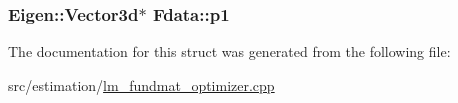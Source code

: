 \subsubsection[{p1}]{\setlength{\rightskip}{0pt plus 5cm}Eigen\+::\+Vector3d$\ast$ Fdata\+::p1}\label{structFdata_af6610aef66eaa2706fe2c60e831d8ec7}


The documentation for this struct was generated from the following file\+:\begin{DoxyCompactItemize}
\item 
src/estimation/\hyperlink{lm__fundmat__optimizer_8cpp}{lm\+\_\+fundmat\+\_\+optimizer.\+cpp}\end{DoxyCompactItemize}
